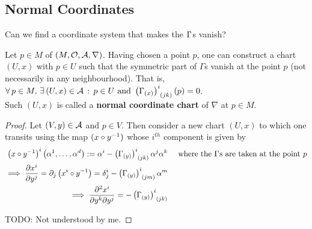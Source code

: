 \subsection{Normal Coordinates}
Can we find a coordinate system that makes the $\ccf{}{}$s vanish?

\begin{theorem}
Let $p \in M$ of $(M, \mathcal{O}, \mathcal{A}, \nabla)$. Having chosen a point $p$, one can construct a chart $(U,x)$ with $p \in U$ such that the symmetric part of $\Gamma$s vanish at the point $p$ (not necessarily in any neighbourhood). That is, \\
$\displaystyle\forall \, p \in M, \, \exists \, (U,x) \in \A \, : \, p \in U \text{ and } \ccfx{i}{(jk)}{(x)}(p) = 0$. \\
Such $(U,x)$ is called a \textbf{normal coordinate chart} of $\nabla$ at $p \in M$.
\end{theorem}

\begin{proof}
Let $(V,y) \in \mathcal{A}$ and $p \in V$. Then consider a new chart $(U,x)$ to which one transits using the map $(x \circ y^{-1})$ whose $i^{th}$ component is given by\\
\begin{align*}
\left(x \after y^{-1}\right)^i\left(\alpha^1,\dotsc,\alpha^d\right) := \alpha^i - \ccfx{i}{(jk)}{(y)} \alpha^j \alpha^k && \text{ where the } \ccf{}{} \text{s are taken at the point } p \\ 
\implies \displaystyle\cibasis[x^i]{y^j} = \partial_j\left(x^i \after y^{-1}\right) = \delta^i_j - \ccfx{i}{(jm)}{(y)} \alpha^m \\
\implies \displaystyle\frac{\partial^2 x^i}{\partial y^k \partial y^j} = - \ccfx{i}{(jk)}{(y)} 
\end{align*}

TODO: Not understood by me.
\end{proof}
